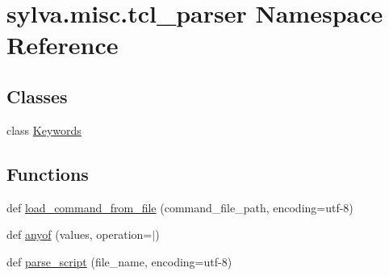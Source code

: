 \hypertarget{namespacesylva_1_1misc_1_1tcl__parser}{}\section{sylva.\+misc.\+tcl\+\_\+parser Namespace Reference}
\label{namespacesylva_1_1misc_1_1tcl__parser}
\subsection*{Classes}
\begin{DoxyCompactItemize}
\item 
class \hyperlink{classsylva_1_1misc_1_1tcl__parser_1_1_keywords}{Keywords}
\end{DoxyCompactItemize}
\subsection*{Functions}
\begin{DoxyCompactItemize}
\item 
def \hyperlink{namespacesylva_1_1misc_1_1tcl__parser_a3a51f30aa622037c144676d280943caa}{load\+\_\+command\+\_\+from\+\_\+file} (command\+\_\+file\+\_\+path, encoding=\textquotesingle{}utf-\/8\textquotesingle{})
\item 
def \hyperlink{namespacesylva_1_1misc_1_1tcl__parser_abc9d84dd4132e13b642242dfac628084}{anyof} (values, operation=\textquotesingle{}$\vert$\textquotesingle{})
\item 
def \hyperlink{namespacesylva_1_1misc_1_1tcl__parser_aab59812e931f24c8e7d1cbffd2fe587e}{parse\+\_\+script} (file\+\_\+name, encoding=\textquotesingle{}utf-\/8\textquotesingle{})
\end{DoxyCompactItemize}
